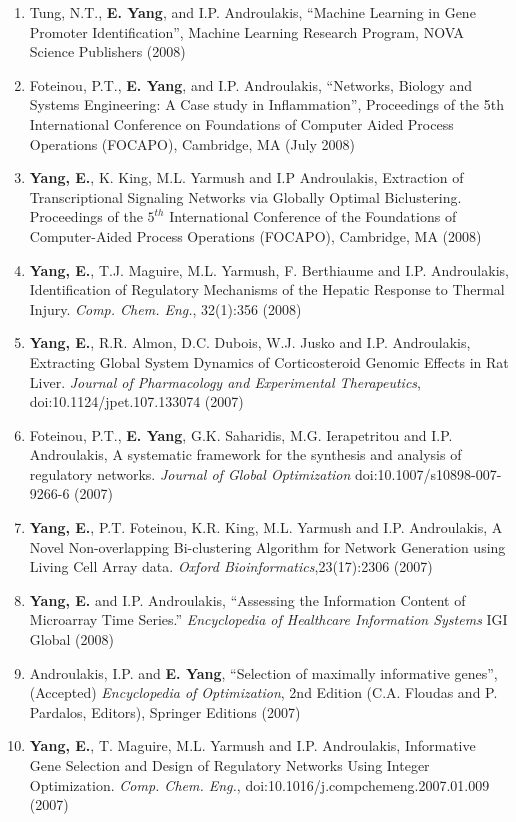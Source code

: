 \documentclass[letterpaper,9pt]{article}
\begin{document}
\begin{enumerate}
\item{{\small Tung, N.T., \textbf{E. Yang}, and I.P. Androulakis, ``Machine Learning in Gene Promoter Identification'', Machine Learning Research Program, NOVA Science Publishers (2008)}}
\item{{\small Foteinou, P.T., \textbf{E. Yang}, and I.P. Androulakis, ``Networks, Biology and Systems Engineering: A Case study in Inflammation'', Proceedings of the 5th International Conference on Foundations of Computer Aided Process Operations (FOCAPO), Cambridge, MA (July 2008)}}
\item{{\small \textbf{Yang, E.}, K. King, M.L. Yarmush and I.P Androulakis, Extraction of Transcriptional Signaling Networks via Globally Optimal Biclustering. Proceedings of the $5^{th}$ International Conference of the Foundations of Computer-Aided Process Operations (FOCAPO), Cambridge, MA (2008)}}
\item{{\small \textbf{Yang, E.}, T.J. Maguire, M.L. Yarmush, F. Berthiaume and I.P. Androulakis, Identification of Regulatory Mechanisms of the Hepatic Response to Thermal Injury. \emph{Comp. Chem. Eng.}, 32(1):356 (2008)}}
\item{{\small \textbf{Yang, E.}, R.R. Almon, D.C. Dubois, W.J. Jusko and I.P. Androulakis, Extracting Global System Dynamics of Corticosteroid Genomic Effects in Rat Liver. \emph{Journal of Pharmacology and Experimental Therapeutics}, doi:10.1124/jpet.107.133074 (2007)}}
\item{{\small Foteinou, P.T., \textbf{E. Yang}, G.K. Saharidis, M.G. Ierapetritou and I.P. Androulakis, A systematic framework for the synthesis and analysis of regulatory networks. \emph{Journal of Global Optimization} doi:10.1007/s10898-007-9266-6 (2007)}}
\item{{\small \textbf{Yang, E.}, P.T. Foteinou, K.R. King, M.L. Yarmush and I.P. Androulakis, A Novel Non-overlapping Bi-clustering Algorithm for Network Generation using Living Cell Array data. \emph{Oxford Bioinformatics},23(17):2306 (2007)}}
\item{{\small\textbf{Yang, E.} and I.P. Androulakis, ``Assessing the Information Content of Microarray Time Series.'' \emph{Encyclopedia of Healthcare Information Systems} IGI Global (2008)}}
\item{{\small Androulakis, I.P. and \textbf{E. Yang}, ``Selection of maximally informative genes'', (Accepted) \emph{Encyclopedia of Optimization}, 2nd Edition (C.A. Floudas and P. Pardalos, Editors), Springer Editions (2007)}}
\item{{\small \textbf{Yang, E.}, T. Maguire, M.L. Yarmush and I.P. Androulakis, Informative Gene Selection and Design of Regulatory Networks Using Integer Optimization. \emph{Comp. Chem. Eng.}, doi:10.1016/j.compchemeng.2007.01.009 (2007)}}

\end{enumerate}
\end{document}
